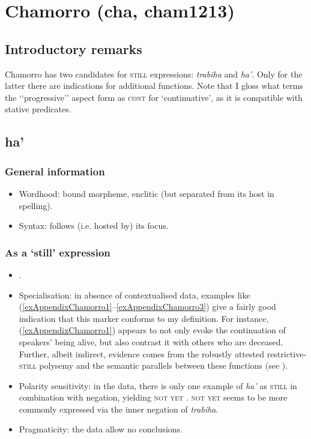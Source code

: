\section{Chamorro (cha, cham1213)}
\subsection{Introductory remarks}
Chamorro has two candidates for \textsc{still} expressions: \textit{trabiha} and \textit{ha'}. Only for the latter there are indications for additional functions. Note that I gloss what \textcite{Chung2020} terms the \lq\lq progressive\rq\rq{ }aspect form as \textsc{cont} for \lq continuative\rq{}, as it is compatible with stative predicates.

\subsection{ha'}
\subsubsection{General information}
\begin{itemize}
	\item Wordhood: bound morpheme, enclitic (but separated from its host in spelling).
	\item Syntax: follows (i.e. hosted by) its focus.
\end{itemize}

\subsubsection{As a \lq{}still\rq{ }expression}
\begin{itemize}
	\item \textcite[513]{Chung2020}.
	\item Specialisation: in absence of contextualised data, examples like (\ref{exAppendixChamorro1}–\ref{exAppendixChamorro3}) give a fairly good indication that this marker conforms to my definition. For instance, (\ref{exAppendixChamorro1}) appears to not only evoke the continuation of speakers' being alive, but also contrast it with others who are deceased. Further, albeit indirect, evidence comes from the robustly attested restrictive-\textsc{still} polysemy and the semantic parallels between these functions (see ).
	\item Polarity sensitivity: in the data, there is only one example of \textit{ha'} as \textsc{still} in combination with negation, yielding \textsc{not yet} \parencite[603]{Chung2020}. \textsc{not yet} seems to be more commonly expressed via the inner negation of \textit{trabiha}.
	\item Pragmaticity: the data allow no conclusions.
\end{itemize}

